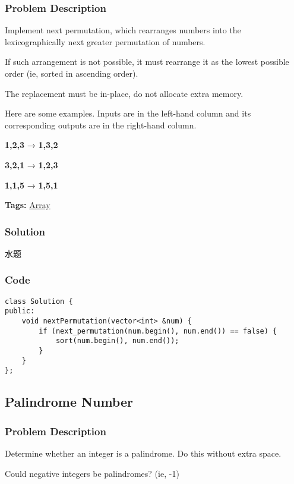 \documentclass{article}
\begin{document}
\begin{CJK*}{UTF8}{gkai}
\subsubsection*{Problem Description}
Implement next permutation, which rearranges numbers into the lexicographically next greater permutation of numbers.

If such arrangement is not possible, it must rearrange it as the lowest possible order (ie, sorted in ascending order).

The replacement must be in-place, do not allocate extra memory.

Here are some examples. Inputs are in the left-hand column and its corresponding outputs are in the right-hand column.


\textbf{1,2,3} → \textbf{1,3,2}


\textbf{3,2,1} → \textbf{1,2,3}


\textbf{1,1,5} → \textbf{1,5,1}


\textbf{Tags: }
\hyperref[ Array ]{ Array }



\subsubsection*{Solution}
水题

\subsubsection*{Code}
\begin{lstlisting}
class Solution {
public:
    void nextPermutation(vector<int> &num) {
        if (next_permutation(num.begin(), num.end()) == false) {
            sort(num.begin(), num.end());
        }
    }
}; 
\end{lstlisting}


\subsection{ Palindrome Number }
\label{ Palindrome Number }

\subsubsection*{Problem Description}
Determine whether an integer is a palindrome. Do this without extra space.

Could negative integers be palindromes? (ie, -1)


\end{CJK*}
\end{document}
